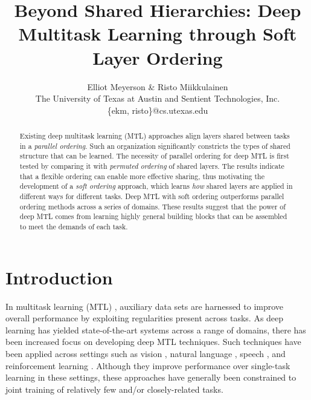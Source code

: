 \documentclass{article}
\theoremstyle{definition}
\theoremstyle{remark}
\begin{document}
\title{Beyond Shared Hierarchies: Deep Multitask Learning through Soft Layer Ordering}
\author{Elliot Meyerson \& Risto Miikkulainen\\
The University of Texas at Austin and Sentient Technologies, Inc.\\
\{ekm, risto\}@cs.utexas.edu
}

\maketitle

\begin{abstract}
Existing deep multitask learning (MTL) approaches align layers shared between tasks in a \emph{parallel ordering}.
Such an organization significantly constricts the types of shared structure that can be learned.
The necessity of parallel ordering for deep MTL is first tested by comparing it with \emph{permuted ordering} of shared layers.
The results indicate that a flexible ordering can enable more effective sharing, thus motivating the development of a \emph{soft ordering} approach, which learns \emph{how} shared layers are applied in different ways for different tasks.
Deep MTL with soft ordering outperforms parallel ordering methods across a series of domains.
These results suggest that the power of deep MTL comes from learning highly general building blocks that can be assembled to meet the demands of each task.
\end{abstract}

\section{Introduction}

In multitask learning (MTL) \citep{Caruana:1998}, auxiliary data sets are harnessed to improve overall performance by exploiting regularities present across tasks.
As deep learning has yielded state-of-the-art systems across a range of domains, there has been increased focus on developing deep MTL techniques.
Such techniques have been applied across settings such as vision \citep{Bilen:2016,Bilen:2017,Jou:2016,Lu:2016,Misra:2016,Ranjan:2016,Yang:2017,Zhang:2014}, natural language \citep{Collobert:2008,Dong:2015,Hashimoto:2016,Liu:2015,Luong:2016}, speech \citep{Huang:2013,Huang:2015,Seltzer:2013,Wu:2015}, and reinforcement learning \citep{Devin:2016,Fernando:2017,Jaderberg:2016,Rusu:2016}.
Although they improve performance over single-task learning in these settings, these approaches have generally been constrained to joint training of relatively few and/or closely-related tasks. 
\end{document}
